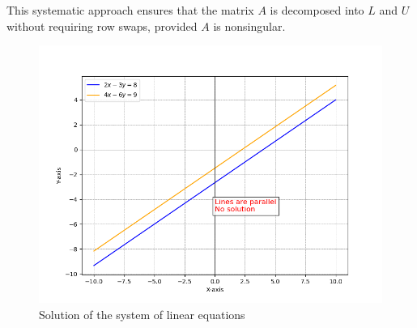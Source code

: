 \documentclass[journal]{IEEEtran}
\begin{document}
This systematic approach ensures that the matrix \( A \) is decomposed into \( L \) and \( U \) without requiring row swaps, provided \( A \) is nonsingular.

\begin{figure}[!ht]
		\centering
		\includegraphics[width=\columnwidth]{figs/Figure_1.png}
		\caption{Solution of the system of linear equations}
		\label{stemplot}
	\end{figure}
\end{document}
